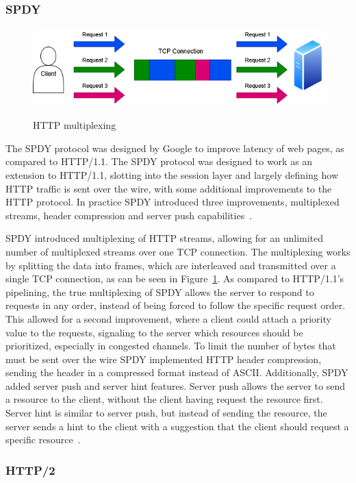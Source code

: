 \documentclass[english, 12pt, a4paper, elec, utf8, a-2b, online]{aaltothesis}
\begin{document}
\subsubsection{SPDY}

\begin{figure}[h]
	\centering
	\includegraphics[alt={Block diagram of HTTP multiplexing.}, height=3cm]{./images/http_multiplex.png}
	\caption{HTTP multiplexing}
	\label{fig:http_mux}
\end{figure}

The SPDY protocol was designed by Google to improve latency of web pages, as compared
to HTTP/1.1. The SPDY protocol was designed to work as an extension to HTTP/1.1,
slotting into the session layer and largely defining how HTTP traffic is sent over the
wire, with some additional improvements to the HTTP protocol. In practice SPDY
introduced three improvements, multiplexed streams, header compression and server push capabilities~\cite{spdy}.

SPDY introduced multiplexing of HTTP streams, allowing for an unlimited number
of multiplexed streams over one TCP connection. The multiplexing works by splitting
the data into frames, which are interleaved and transmitted over a single TCP connection,
as can be seen in Figure~\ref{fig:http_mux}. As compared to HTTP/1.1's pipelining,
the true multiplexing of SPDY allows the server to respond to requests in any order,
instead of being forced to follow the specific request order. This allowed for a second improvement,
where a client could attach a priority value to the requests, signaling to the server
which resources should be prioritized, especially in congested channels. To limit
the number of bytes that must be sent over the wire SPDY implemented HTTP header
compression, sending the header in a compressed format instead of ASCII. Additionally,
SPDY added server push and server hint features. Server push allows the server to
send a resource to the client, without the client having request the resource first.
Server hint is similar to server push, but instead of sending the resource, the
server sends a hint to the client with a suggestion that the client should request
a specific resource~\cite{spdy}.
\subsubsection{HTTP/2}
\end{document}
